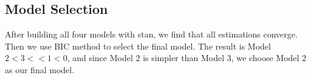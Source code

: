 \documentclass[11pt,a4paper]{article}
\begin{document}
\subsection{Model Selection}

After building all four models with stan, we find that all estimations converge. Then we use BIC method to select the final model. 
The result is Model $2<3<<1<0$, and since Model 2 is simpler than Model 3, we choose Model 2 as our final model.

\begin{minipage}{\linewidth}
    \label{fig:rhat}
\end{minipage}\\

\begin{minipage}{\linewidth}
    \label{fig:traceplot}
\end{minipage}\\
\end{document}

